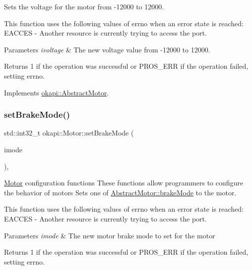 Sets the voltage for the motor from -\/12000 to 12000.

This function uses the following values of errno when an error state is reached\+: E\+A\+C\+C\+ES -\/ Another resource is currently trying to access the port.


\begin{DoxyParams}{Parameters}
{\em ivoltage} & The new voltage value from -\/12000 to 12000. \\
\hline
\end{DoxyParams}
\begin{DoxyReturn}{Returns}
1 if the operation was successful or P\+R\+O\+S\+\_\+\+E\+RR if the operation failed, setting errno. 
\end{DoxyReturn}


Implements \mbox{\hyperlink{classokapi_1_1AbstractMotor_a15d12555f527109b046c65fe753d7e20}{okapi\+::\+Abstract\+Motor}}.

\mbox{\label{classokapi_1_1Motor_a2c40313fa5ff49c25947645885898f91}} 
\subsubsection{\texorpdfstring{setBrakeMode()}{setBrakeMode()}}
{\footnotesize\ttfamily std\+::int32\+\_\+t okapi\+::\+Motor\+::set\+Brake\+Mode (\begin{DoxyParamCaption}\item[{\mbox{\hyperlink{classokapi_1_1AbstractMotor_a132e0485dbb59a60c3f934338d8fa601}{Abstract\+Motor\+::brake\+Mode}}}]{imode }\end{DoxyParamCaption})\hspace{0.3cm}{\ttfamily [override]}, {\ttfamily [virtual]}}

\mbox{\hyperlink{classokapi_1_1Motor}{Motor}} configuration functions These functions allow programmers to configure the behavior of motors Sets one of \mbox{\hyperlink{classokapi_1_1AbstractMotor_a132e0485dbb59a60c3f934338d8fa601}{Abstract\+Motor\+::brake\+Mode}} to the motor.

This function uses the following values of errno when an error state is reached\+: E\+A\+C\+C\+ES -\/ Another resource is currently trying to access the port.


\begin{DoxyParams}{Parameters}
{\em imode} & The new motor brake mode to set for the motor \\
\hline
\end{DoxyParams}
\begin{DoxyReturn}{Returns}
1 if the operation was successful or P\+R\+O\+S\+\_\+\+E\+RR if the operation failed, setting errno. 
\end{DoxyReturn}


